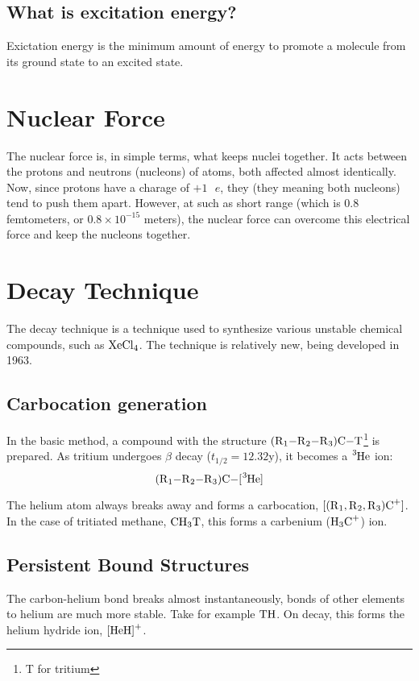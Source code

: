 \documentclass{article}
\begin{document}
\begin{multicols*}{2}
    \subsection{What is excitation energy?}
    Exictation energy is the minimum amount of energy to promote a molecule
    from its ground state to an excited state.


    \section{Nuclear Force}
    The nuclear force is, in simple terms, what keeps nuclei together. It
    acts between the protons and neutrons (nucleons) of atoms, both affected
    almost identically.\\

    Now, since protons have a charage of $+1\text{ }e$, they (they meaning
    both nucleons) tend to push them apart. However, at such as short range
    (which is $0.8$ femtometers, or $0.8 \times 10^{-15}$ meters), the nuclear
    force can overcome this electrical force and keep the nucleons together.

    \section{Decay Technique}
    The decay technique is a technique used to synthesize various unstable chemical
    compounds, such as $\ce{XeCl4}$. The technique is relatively new, being developed
    in 1963.

    \subsection{Carbocation generation}
    In the basic method, a compound with the structure $\ce{(R1-R2-R3)C-T}$\footnote{T for tritium}
    is prepared. As tritium undergoes $\beta$ decay ($t_{1/2} = 12.32$y), it becomes
    a $\ce{^{3}He}$ ion:
    \[
      \ce{(R1-R2-R3)C-[^{3}He]}
    \]

    The helium atom always breaks away and forms a carbocation, $\ce{[(R1,R2,R3)C+]}$.
    In the case of tritiated methane, $\ce{CH3T}$, this forms a carbenium ($\ce{H3C+}$) ion.

    \subsection{Persistent Bound Structures}
    The carbon-helium bond breaks almost instantaneously, bonds of other elements to helium
    are much more stable. Take for example $\ce{TH}$. On decay, this forms the
    helium hydride ion, $\ce{[HeH]+}$.\\


\end{multicols*}
\end{document}
